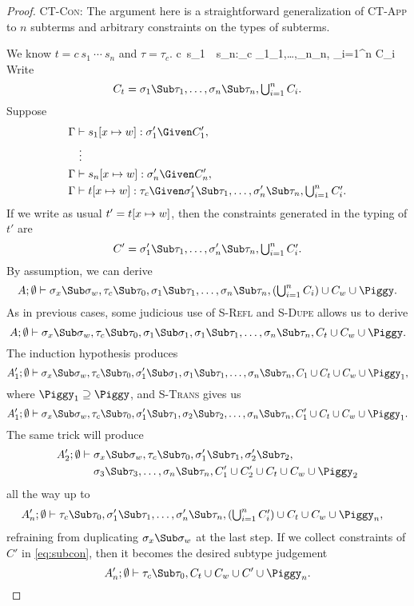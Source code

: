 \begin{proof}
\Case\textsc{CT-Con}: The argument here is a straightforward
generalization of \hbox{\textsc{CT-App}} to $n$ subterms and
arbitrary constraints on the types of subterms.

We know $t=c~s_1~\cdots~s_n$ and $\tau=\tau_c$.
%
{\Gamma\vdash c~s_1~\cdots~s_n:\tau_c\Given
\sigma_1\Sub\tau_1,\ldots,\sigma_n\Sub\tau_n,
{\textstyle\bigcup_{i=1}^n C_i}
}
%
Write
\[
C_t=\sigma_1\Sub\tau_1,\ldots,\sigma_n\Sub\tau_n,
{\textstyle\bigcup_{i=1}^n C_i}.
\]
Suppose
\begin{align*}
\Gamma&\vdash s_1[x\mapsto \Xdef]:\sigma_1'\Given C_1',\\
&~\vdots\\
\Gamma&\vdash s_n[x\mapsto \Xdef]:\sigma_n'\Given C_n',\\
\Gamma&\vdash t[x\mapsto \Xdef]:\tau_c\Given
\sigma_1'\Sub\tau_1,\ldots,\sigma_n'\Sub\tau_n,
{\textstyle\bigcup_{i=1}^n C_i'}.
\end{align*}
If we write as usual $t'=t[x\mapsto w]$, then the constraints
generated in the typing of $t'$ are
\[
C'=\sigma_1'\Sub\tau_1,\ldots,\sigma_n'\Sub\tau_n,
{\textstyle\bigcup_{i=1}^n C_i'}.
\]
By assumption, we can derive
\[
A;\Exigent\vdash \sigma_x\Sub\sigma_\Xdef,\tau_c\Sub\tau_0,
\sigma_1\Sub\tau_1,\ldots,\sigma_n\Sub\tau_n,
({\textstyle\bigcup_{i=1}^n C_i})
\cup C_\Xdef\cup\Piggy.
\]
As in previous cases, some judicious use of \textsc{S-Refl} and
\textsc{S-Dupe} allows us to derive
\[
A;\Exigent\vdash \sigma_x\Sub\sigma_\Xdef,\tau_c\Sub\tau_0,
\sigma_1\Sub\sigma_1,
\sigma_1\Sub\tau_1,\ldots,\sigma_n\Sub\tau_n,
C_t\cup C_\Xdef\cup\Piggy.
\]
The induction hypothesis produces
\[
A_1';\Exigent\vdash \sigma_x\Sub\sigma_\Xdef,\tau_c\Sub\tau_0,
\sigma_1'\Sub\sigma_1,
\sigma_1\Sub\tau_1,\ldots,\sigma_n\Sub\tau_n,
C_1\cup C_t\cup C_\Xdef\cup\Piggy_1,
\]
where $\Piggy_1\supseteq\Piggy$, and \textsc{S-Trans} gives us
\[
A_1';\Exigent\vdash \sigma_x\Sub\sigma_\Xdef,\tau_c\Sub\tau_0,
\sigma_1'\Sub\tau_1,
\sigma_2\Sub\tau_2,\ldots,\sigma_n\Sub\tau_n,
C_1'\cup
C_t\cup C_\Xdef\cup
\Piggy_1.
\]
The same trick will produce
\begin{align*}
A_2';\Exigent\vdash\;& \sigma_x\Sub\sigma_\Xdef,\tau_c\Sub\tau_0,
\sigma_1'\Sub\tau_1,
\sigma_2'\Sub\tau_2,\\
&\sigma_3\Sub\tau_3,
\ldots,\sigma_n\Sub\tau_n,
C_1'\cup C_2'\cup
C_t\cup C_\Xdef\cup\Piggy_2
\end{align*}
all the way up to
\begin{align}
A_n';\Exigent&\vdash \tau_c\Sub\tau_0,
\sigma_1'\Sub\tau_1,\ldots,\sigma_n'\Sub\tau_n,
({\textstyle\bigcup_{i=1}^nC_i'})\cup
C_t\cup C_\Xdef\cup\Piggy_n,
\label{eq:subcon}
\end{align}
refraining from duplicating $\sigma_x\Sub\sigma_\Xdef$ at the last
step. If we collect constraints of $C'$ in \eqref{eq:subcon},
then it becomes the desired subtype judgement
\[
A_n';\Exigent\vdash \tau_c\Sub\tau_0,
C_t\cup C_\Xdef\cup C'\cup\Piggy_n.
\]


\end{proof}
